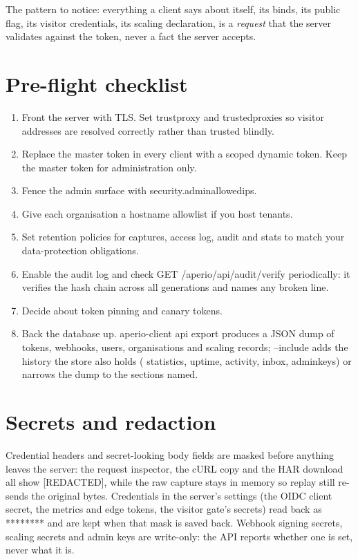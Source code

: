 \documentclass[11pt,a4paper,oneside]{book}
\newcommand{\aperiobreakableunderscore}{\textunderscore\allowbreak}
\newcommand{\aperiocodebreaks}{\XeTeXinterchartokenstate=1 }
\newcommand{\aperiocodebreaks}{}
\DeclareRobustCommand{\code}[1]{{\ttfamily\small\aperiocodebreaks
  \let\_\aperiobreakableunderscore#1}}
\begin{document}
The pattern to notice: everything a client says about itself, its binds,
its public flag, its visitor credentials, its scaling declaration, is a
\emph{request} that the server validates against the token, never a fact
the server accepts.

\section{Pre-flight checklist}

\begin{enumerate}[leftmargin=1.5em]
  \item Front the server with TLS. Set \code{trust\_proxy} and
        \code{trusted\_proxies} so visitor addresses are resolved
        correctly rather than trusted blindly.
  \item Replace the master token in every client with a scoped dynamic
        token. Keep the master token for administration only.
  \item Fence the admin surface with \code{security.admin\_allowed\_ips}.
  \item Give each organisation a hostname allowlist if you host tenants.
  \item Set retention policies for captures, access log, audit and stats
        to match your data-protection obligations.
  \item Enable the audit log and check
        \code{GET /aperio/api/audit/verify} periodically: it verifies the
        hash chain across all generations and names any broken line.
  \item Decide about token pinning and canary tokens.
  \item Back the database up. \code{aperio-client api export} produces a
        JSON dump of tokens, webhooks, users, organisations and scaling
        records; \code{--include} adds the history the store also holds
        (\code{statistics}, \code{uptime}, \code{activity}, \code{inbox},
        \code{admin\_keys}) or narrows the dump to the sections named.
\end{enumerate}

\section{Secrets and redaction}

Credential headers and secret-looking body fields are masked before
anything leaves the server: the request inspector, the cURL copy and the
HAR download all show \code{[REDACTED]}, while the raw capture stays in
memory so replay still re-sends the original bytes. Credentials in the
server's settings (the OIDC client secret, the metrics and edge tokens, the
visitor gate's secrets) read back as \code{********} and are kept when that
mask is saved back. Webhook signing secrets, scaling secrets and admin keys
are write-only: the API reports whether one is set, never what it is.
\end{document}
